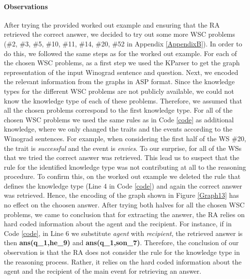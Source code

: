 \paragraph{Observations}
After trying the provided worked out example and ensuring that the RA retrieved the correct answer, we decided to try out some more WSC problems (\#2, \#3, \#5, \#10, \#11, \#14, \#20, \#52 in Appendix \ref{AppendixB}).
In order to do this, we followed the same steps as for the worked out example. For each of the chosen WSC problems, as a first step we used the KParser to get the graph representation of the input Winograd sentence and question. Next, we encoded the relevant information from the graphs in ASP format. Since the knowledge types for the different WSC problems are not publicly available, we could not know the knowledge type of each of these problems. Therefore, we assumed that all the chosen problems correspond to the first knowledge type. For all of the chosen WSC problems we used the same rules as in Code \ref{code} as additional knowledge, where we only changed the traits and the events according to the Winograd sentences. For example, when considering the first half of the WS \#20, the trait is \textit{successful} and the event is \textit{envies}. To our surprise, for all of the WSs that we tried the correct answer was retrieved. This lead us to suspect that the rule for the identified knowledge type was not contributing at all to the reasoning procedure. 
To confirm this, on the worked out example we deleted the rule that defines the knowledge type (Line 4 in Code \ref{code}) and again the correct answer was retrieved. Hence, the encoding of the graph shown in Figure \ref{Graph13} has no effect on the choosen answer. After trying both halves for all the chosen WSC problems, we came to conclusion that for extracting the answer, the RA relies on hard coded information about the agent and the recipient. For instance, if in Code \ref{code}, in Line 6 we substitute \textit{agent} with \textit{recipient}, the retrieved answer is then \textbf{ans(q\_1,he\_9)} and \textbf{ans(q\_1,son\_7)}.
Therefore, the conclusion of our observation is that the RA does not consider the rule for the knowledge type in the reasoning process. Rather, it relies on the hard coded information about the agent and the recipient of the main event for retrieving an answer. 

